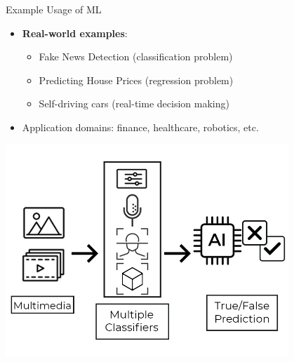 \documentclass[serif, aspectratio=169]{beamer}
\begin{document}
\begin{frame}{Example Usage of ML}
\begin{minipage}{0.4\textwidth}
\begin{itemize}
    \item \textbf{Real-world examples}:
    \begin{itemize}
        \item Fake News Detection (classification problem)
        \item Predicting House Prices (regression problem)
        \item Self-driving cars (real-time decision making)
    \end{itemize}
    \item Application domains: finance, healthcare, robotics, etc.
\end{itemize}
\end{minipage}%
\begin{minipage}{0.6\textwidth}
    \centering
    \includegraphics[width=0.8\textwidth]{pic/propaganda_detection.jpg}
\end{minipage}
\end{frame}
\end{document}
